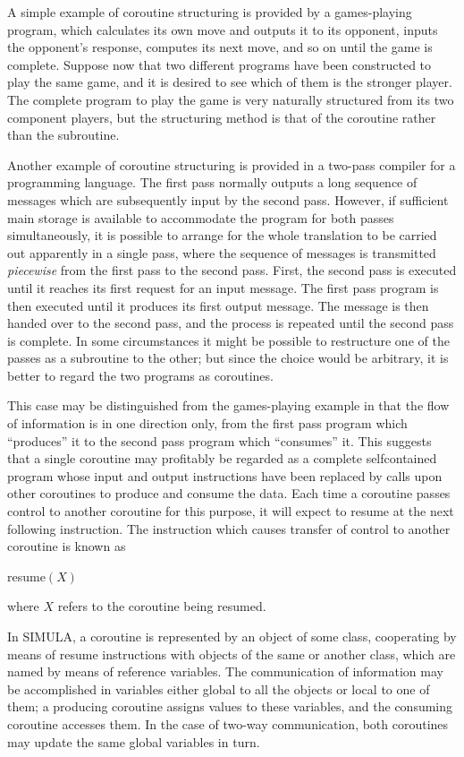 A simple example of coroutine structuring is provided by a games-playing program, which calculates its own move and outputs it to its opponent, inputs the opponent's response, computes its next move, and so on until the game is complete. Suppose now that two different programs have been constructed to play the same game, and it is desired to see which of them is the stronger player. The complete program to play the game is very naturally structured from its two component players, but the structuring method is that of the coroutine rather than the subroutine.

Another example of coroutine structuring is provided in a two-pass compiler for a programming language. The first pass normally outputs a long sequence of messages which are subsequently input by the second pass. However, if sufficient main storage is available to accommodate the program for both passes simultaneously, it is possible to arrange for the whole translation to be carried out apparently in a single pass, where the sequence of messages is transmitted \textit{piecewise} from the first pass to the second pass. First, the second pass is executed until it reaches its first request for an input message. The first pass program is then executed until it produces its first output message. The message is then handed over to the second pass, and the process is repeated until the second pass is complete. In some circumstances it might be possible to restructure one of the passes as a subroutine to the other; but since the choice would be arbitrary, it is better to regard the two programs as coroutines.

This case may be distinguished from the games-playing example in that the flow of information is in one direction only, from the first pass program which ``produces'' it to the second pass program which ``consumes'' it. This suggests that a single coroutine may profitably be regarded as a complete selfcontained program whose input and output instructions have been replaced by calls upon other coroutines to produce and consume the data. Each time a coroutine passes control to another coroutine for this purpose, it will expect to resume at the next following instruction. The instruction which causes transfer of control to another coroutine is known as

\quad resume$(X)$

\noindent
where $X$ refers to the coroutine being resumed.

In SIMULA, a coroutine is represented by an object of some class, cooperating by means of resume instructions with objects of the same or another class, which are named by means of reference variables. The communication of information may be accomplished in variables either global to all the objects or local to one of them; a producing coroutine assigns values to these variables, and the consuming coroutine accesses them. In the case of two-way communication, both coroutines may update the same global variables in turn.

